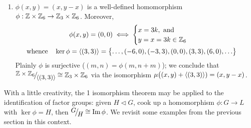 \begin{examples}{}{}
\begin{enumerate}
  \item $\phi(x,y)=(x,y-x)$ is a well-defined homomorphism $\phi:\mathbb{Z}\times\mathbb{Z}_6\to\mathbb{Z}_3\times\mathbb{Z}_6$. Moreover,
  \begin{gather*}
  	\phi(x,y)=(0,0)\iff
  	\begin{cases}
  		x=3k,\text{ and}\\
  		y=x=3k\in\mathbb{Z}_6
  	\end{cases}\\
  	\text{whence}\quad
  	\ker\phi=\left\langle (3,3)\right\rangle=\bigl\{\ldots,(-6,0),(-3,3),(0,0),(3,3),(6,0),\ldots\bigr\}
  \end{gather*}
  Plainly $\phi$ is surjective ($(m,n)=\phi(m,n+m)$); we conclude that $\quotient{\Z\times\Z_6}{\ip{(3,3)}}\cong\Z_3\times\Z_6$ via the isomorphism $\mu\bigl((x,y)+\left\langle (3,3)\right\rangle)=(x,y-x)$.
	\end{enumerate}
\end{examples}

\vfil

\goodbreak


With a little creativity, the 1\st{} isomorphism theorem may be applied to the identification of factor groups: given $H\triangleleft G$, cook up a homomorphism $\phi:G\to L$ with $\ker\phi=H$, then $\quotient GH\cong\image\phi$. We revisit some examples from the previous section in this context.


